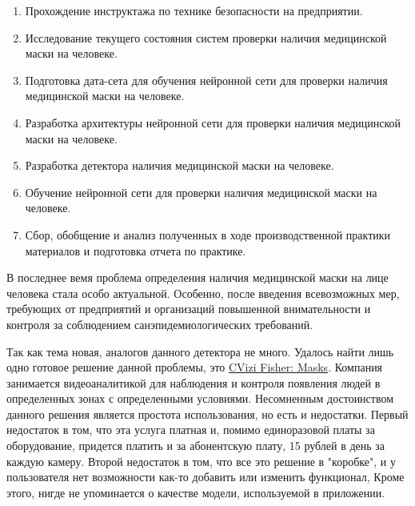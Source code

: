 \documentclass[a4paper,14pt]{article}
\begin{document}
\begin{enumerate}
	
	\item Прохождение инструктажа по технике безопасности на предприятии.
	
	\item Исследование текущего состояния систем проверки наличия медицинской маски на человеке.
	
	\item Подготовка дата-сета для обучения нейронной сети для проверки наличия медицинской маски на человеке.
	
	\item Разработка архитектуры нейронной сети для проверки наличия медицинской маски на человеке.
	
	\item Разработка детектора наличия медицинской маски на человеке.
	
	\item Обучение нейронной сети для проверки наличия медицинской маски на человеке.
	
	\item Сбор, обобщение и анализ полученных в ходе производственной практики материалов и подготовка отчета по практике.
	
\end{enumerate}

В последнее вемя проблема определения наличия медицинской маски на лице человека стала особо актуальной.
Особенно, после введения всевозможных мер, требующих от предприятий и организаций повышенной внимательности и контроля за соблюдением санэпидемиологических требований.

Так как тема новая, аналогов данного детектора не много.
Удалось найти лишь одно готовое решение данной проблемы, это \href{https://fisher.cvizi.com/#solutions}{CVizi Fisher: Masks}.
Компания занимается видеоаналитикой для наблюдения и контроля появления людей в определенных зонах с определенными условиями. 
Несомненным достоинством данного решения является простота использования, но есть и недостатки.
Первый недостаток в том, что эта услуга платная и, помимо единоразовой платы за оборудование, придется платить и за абонентскую плату, 15 рублей в день за каждую камеру.
Второй недостаток в том, что все это решение в "коробке", и у пользователя нет возможности как-то добавить или изменить функционал,
Кроме этого, нигде не упоминается о качестве модели, используемой в приложении.
\end{document}

